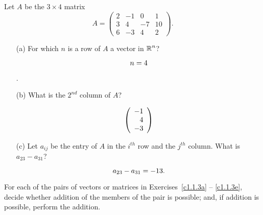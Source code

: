 \documentclass{ximera}
\begin{document}
\begin{exercise} \label{c1.1.2}
Let $A$ be the $3\times 4$ matrix
\[
A=\left(\begin{array}{rrrr} 2 & -1 & 0 & 1 \\ 3 & 4 & -7 & 10\\
        6 & -3 & 4 & 2 \end{array}\right).
\]
\begin{enumerate}
\item[(a)]  For which $n$ is a row of $A$ a vector in $\mbox{$\mathbb{R}$}^n$? \begin{prompt}\[n = {4}\]\end{prompt}.
\item[(b)]  What is the $2^{nd}$ column of $A$?
  \begin{prompt}
    \[
      \left(\begin{array}{r} {-1} \\ {4} \\ {-3} \end{array} \right)
    \]
  \end{prompt}
\item[(c)] Let $a_{ij}$ be the entry of $A$ in the $i^{th}$ row
  and the $j^{th}$ column.  What is $a_{23}-a_{31}$?
  \begin{prompt}
    \[
      a_{23}-a_{31} = {-13}.
    \]
  \end{prompt}
\end{enumerate}

%
\end{exercise}





\problemlabel

\noindent For each of the pairs of vectors or matrices in
Exercises~\ref{c1.1.3a} -- \ref{c1.1.3e}, decide whether addition
of the members of the pair is possible; and, if addition is possible,
perform the addition.
\end{document}
